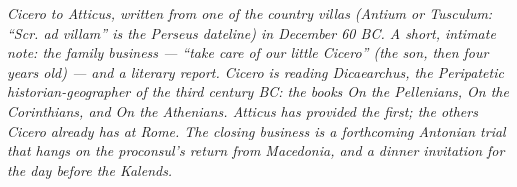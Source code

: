 
\textit{Cicero to Atticus, written from one of the country
villas (Antium or Tusculum: ``Scr. ad villam'' is the
Perseus dateline) in December 60 BC. A short, intimate
note: the family business --- ``take care of our little
Cicero'' (the son, then four years old) --- and a literary
report. Cicero is reading Dicaearchus, the Peripatetic
historian-geographer of the third century BC: the books
\textit{On the Pellenians}, \textit{On the Corinthians},
and \textit{On the Athenians}. Atticus has provided the
first; the others Cicero already has at Rome. The closing
business is a forthcoming Antonian trial that hangs on the
proconsul's return from Macedonia, and a dinner invitation
for the day before the Kalends.}
